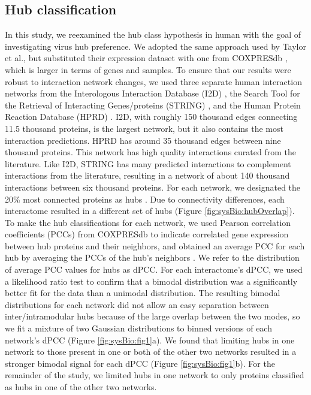\subsection{Hub classification}

In this study, we reexamined the hub class hypothesis in human with
the goal of investigating virus hub preference. We adopted the same
approach used by Taylor et al., but substituted their expression
dataset with one from COXPRESdb \cite{obayashi07}, which is larger in
terms of genes and samples. To ensure that our results were robust to
interaction network changes, we used three separate human interaction
networks from the Interologous Interaction Database (I2D)
\cite{brown05}, the Search Tool for the Retrieval of Interacting
Genes/proteins (STRING) \cite{von07}, and the Human Protein Reaction
Database (HPRD) \cite{prasad08}. I2D, with roughly 150 thousand edges
connecting 11.5 thousand proteins, is the largest network, but it also
contains the most interaction predictions. HPRD has around 35 thousand
edges between nine thousand proteins. This network has high quality
interactions curated from the literature. Like I2D, STRING has many
predicted interactions to complement interactions from the literature,
resulting in a network of about 140 thousand interactions between six
thousand proteins. For each network, we designated the 20\% most
connected proteins as hubs \cite{bertin07}. Due to connectivity
differences, each interactome resulted in a different set of hubs
(Figure \ref{fig:sysBio:hubOverlap}). To make the hub classifications
for each network, we used Pearson correlation coefficients (PCCs) from
COXPRESdb to indicate correlated gene expression between hub proteins
and their neighbors, and obtained an average PCC for each hub by
averaging the PCCs of the hub's neighbors \cite{han04,taylor09}. We
refer to the distribution of average PCC values for hubs as dPCC. For
each interactome's dPCC, we used a likelihood ratio test
\cite{ertel08} to confirm that a bimodal distribution was a
significantly better fit for the data than a unimodal
distribution. The resulting bimodal distributions for each network did
not allow an easy separation between inter/intramodular hubs because
of the large overlap between the two modes, so we fit a mixture of two
Gaussian distributions to binned versions of each network's dPCC
(Figure \ref{fig:sysBio:fig1}a). We found that limiting hubs in one
network to those present in one or both of the other two networks
resulted in a stronger bimodal signal for each dPCC (Figure
\ref{fig:sysBio:fig1}b). For the remainder of the study, we limited
hubs in one network to only proteins classified as hubs in one of the
other two networks.

